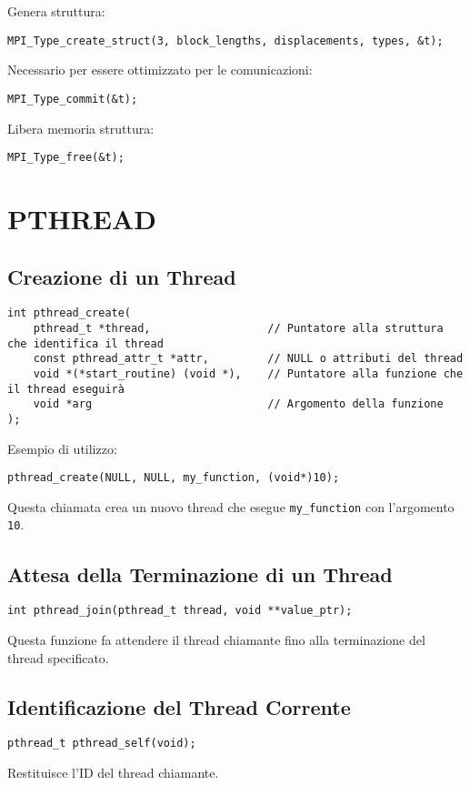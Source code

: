\documentclass{article}
\begin{document}
Genera struttura:
\begin{verbatim}
MPI_Type_create_struct(3, block_lengths, displacements, types, &t);
\end{verbatim}

Necessario per essere ottimizzato per le comunicazioni:
\begin{verbatim}
MPI_Type_commit(&t);
\end{verbatim}

Libera memoria struttura:
\begin{verbatim}
MPI_Type_free(&t);
\end{verbatim}

\section{PTHREAD}

\subsection{Creazione di un Thread}
\begin{verbatim}
int pthread_create(
    pthread_t *thread,                  // Puntatore alla struttura che identifica il thread
    const pthread_attr_t *attr,         // NULL o attributi del thread
    void *(*start_routine) (void *),    // Puntatore alla funzione che il thread eseguirà
    void *arg                           // Argomento della funzione
);
\end{verbatim}
Esempio di utilizzo:
\begin{verbatim}
pthread_create(NULL, NULL, my_function, (void*)10);
\end{verbatim}
Questa chiamata crea un nuovo thread che esegue \texttt{my\_function} con l'argomento \texttt{10}.

\subsection{Attesa della Terminazione di un Thread}
\begin{verbatim}
int pthread_join(pthread_t thread, void **value_ptr);
\end{verbatim}
Questa funzione fa attendere il thread chiamante fino alla terminazione del thread specificato.

\subsection{Identificazione del Thread Corrente}
\begin{verbatim}
pthread_t pthread_self(void);
\end{verbatim}
Restituisce l'ID del thread chiamante.
\end{document}
